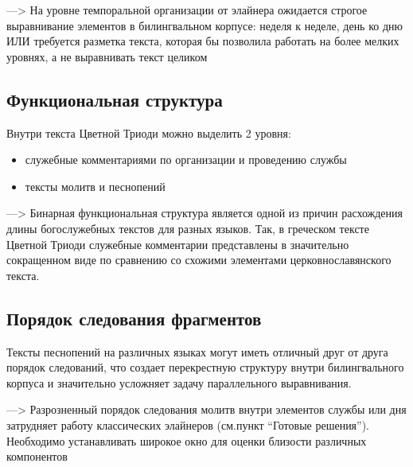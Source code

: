 \documentclass[
  letterpaper,
]{book}
\begin{document}
---\textgreater{} На уровне темпоральной организации от элайнера
ожидается строгое выравнивание элементов в билингвальном корпусе: неделя
к неделе, день ко дню ИЛИ требуется разметка текста, которая бы
позволила работать на более мелких уровнях, а не выравнивать текст
целиком

\hypertarget{ux444ux443ux43dux43aux446ux438ux43eux43dux430ux43bux44cux43dux430ux44f-ux441ux442ux440ux443ux43aux442ux443ux440ux430}{%
\subsection{Функциональная
структура}\label{ux444ux443ux43dux43aux446ux438ux43eux43dux430ux43bux44cux43dux430ux44f-ux441ux442ux440ux443ux43aux442ux443ux440ux430}}

Внутри текста Цветной Триоди можно выделить 2 уровня:

\begin{itemize}
\item
  служебные комментариями по организации и проведению службы
\item
  тексты молитв и песнопений
\end{itemize}

---\textgreater{} Бинарная функциональная структура является одной из
причин расхождения длины богослужебных текстов для разных языков. Так, в
греческом тексте Цветной Триоди служебные комментарии представлены в
значительно сокращенном виде по сравнению со схожими элементами
церковнославянского текста.~

\hypertarget{ux43fux43eux440ux44fux434ux43eux43a-ux441ux43bux435ux434ux43eux432ux430ux43dux438ux44f-ux444ux440ux430ux433ux43cux435ux43dux442ux43eux432}{%
\subsection{Порядок следования
фрагментов}\label{ux43fux43eux440ux44fux434ux43eux43a-ux441ux43bux435ux434ux43eux432ux430ux43dux438ux44f-ux444ux440ux430ux433ux43cux435ux43dux442ux43eux432}}

Тексты песнопений на различных языках могут иметь отличный друг от друга
порядок следований, что создает перекрестную структуру внутри
билингвального корпуса и значительно усложняет задачу параллельного
выравнивания.

---\textgreater{} Разрозненный порядок следования молитв внутри
элементов службы или дня затрудняет работу классических элайнеров
(см.пункт ``Готовые решения''). Необходимо устанавливать широкое окно
для оценки близости различных компонентов
\end{document}
